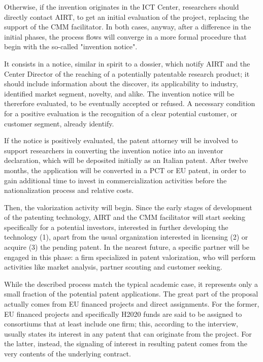 Otherwise, if the invention originates in the ICT Center, researchers should directly contact AIRT, to get an initial evaluation of the project, replacing the support of the CMM facilitator. In both cases, anyway, after a difference in the initial phases, the process flows will converge in a more formal procedure that begin with the so-called "invention notice". 

It consists in a notice, similar in spirit to a dossier, which notify AIRT and the Center Director of the reaching of a potentially patentable research product; it should include information about the discover, its applicability to industry, identified market segment, novelty, and alike. The invention notice will be thererfore evaluated, to be eventually accepted or refused. A necessary condition for a positive evaluation is the recognition of a clear potential customer, or customer segment, already identify.

If the notice is positively evaluated, the patent attorney will be involved to support researchers in converting the invention notice into an inventor declaration, which will be deposited initially as an Italian patent. After twelve months, the application will be converted in a PCT or EU patent, in order to gain additional time to invest in commercialization activities before the nationalization process and relative costs.

Then, the valorization activity will begin. Since the early stages of development of the patenting technology, AIRT and the CMM facilitator will start seeking specifically for a potential investors, interested in further developing the technology (1), apart from the usual organization interested in licensing (2) or acquire (3) the pending patent. In the nearest future, a specific partner will be engaged in this phase: a firm specialized in patent valorization, who will perform activities like market analysis, partner scouting and customer seeking. 

While the described process match the typical academic case, it represents only a small fraction of the potential patent applications. The great part of the proposal actually comes from EU financed projects and direct assignments. For the former, EU financed projects and specifically H2020 funds are said to be assigned to consortiums that at least include one firm; this, according to the interview, usually states its interest in any patent that can originate from the project. For the latter, instead, the signaling of interest in resulting patent comes from the very contents of the underlying contract.

